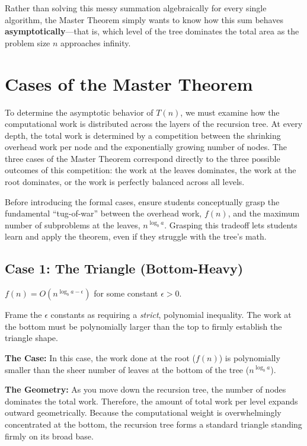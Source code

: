 Rather than solving this messy summation algebraically for every single algorithm, the Master Theorem simply wants to know how this sum behaves \textbf{asymptotically}---that is, which level of the tree dominates the total area as the problem size $n$ approaches infinity. 
\section{Cases of the Master Theorem}
To determine the asymptotic behavior of $T(n)$, we must examine how the computational work is distributed across the layers of the recursion tree. At every depth, the total work is determined by a competition between the shrinking overhead work per node and the exponentially growing number of nodes. The three cases of the Master Theorem correspond directly to the three possible outcomes of this competition: the work at the leaves dominates, the work at the root dominates, or the work is perfectly balanced across all levels.

\begin{educatortip}
    Before introducing the formal cases, ensure students conceptually grasp the fundamental ``tug-of-war'' between the overhead work, $f(n)$, and the maximum number of subproblems at the leaves, $n^{\log_b a}$. Grasping this tradeoff lets students learn and apply the theorem, even if they struggle with the tree's math.
\end{educatortip}

\vspace{0.5cm}
\subsection{Case 1: The Triangle (Bottom-Heavy)}

\begin{tcolorbox}[colback=accent1!10, colframe=accent1, title=\textbf{Condition}]
$f(n) = O(n^{\log_b a - \epsilon})$ for some constant $\epsilon > 0$.
\end{tcolorbox}
\begin{educatortip}    
Frame the $\epsilon$ constants as requiring a \textit{strict}, polynomial inequality. The work at the bottom must be polynomially larger than the top to firmly establish the triangle shape.
\end{educatortip}
\textbf{The Case:} In this case, the work done at the root ($f(n)$) is polynomially smaller than the sheer number of leaves at the bottom of the tree ($n^{\log_b a}$).

\textbf{The Geometry:} As you move down the recursion tree, the number of nodes dominates the total work. Therefore, the amount of total work per level expands outward geometrically. Because the computational weight is overwhelmingly concentrated at the bottom, the recursion tree forms a standard triangle standing firmly on its broad base. 

